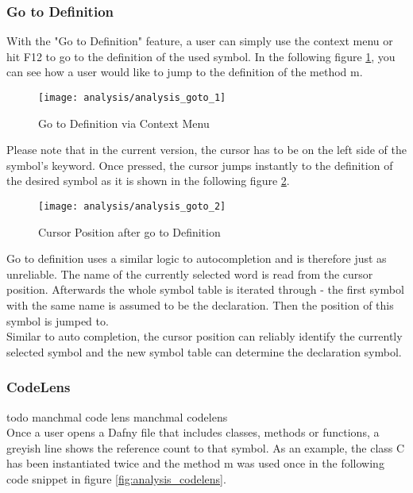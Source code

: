 \subsubsection{Go to Definition}
With the "Go to Definition" feature, a user can simply use the context menu or hit F12 to go to the definition of the used symbol.
In the following figure \ref{fig:analysis_goto_1}, you can see how a user would like to jump to the definition of the method m.

\begin{figure}[H]
    \centering
    \texttt{[image: analysis/analysis\_goto\_1]}
    \caption{Go to Definition via Context Menu}
    \label{fig:analysis_goto_1}
\end{figure}

Please note that in the current version, the cursor has to be on the left side of the symbol's keyword. Once pressed, the cursor jumps instantly to the definition of the desired symbol as it is shown in the following figure \ref{fig:analysis_goto_2}.

\begin{figure}[H]
    \centering
    \texttt{[image: analysis/analysis\_goto\_2]}
    \caption{Cursor Position after go to Definition}
    \label{fig:analysis_goto_2}
\end{figure}

Go to definition uses a similar logic to autocompletion and is therefore just as unreliable.
The name of the currently selected word is read from the cursor position.
Afterwards the whole symbol table is iterated through - the first symbol with the same name is assumed to be the declaration.
Then the position of this symbol is jumped to. \\

Similar to auto completion, the cursor position can reliably identify the currently selected symbol and the new symbol table can determine the declaration symbol.

\subsubsection{CodeLens}
todo manchmal code lens manchmal codelens \\

Once a user opens a Dafny file that includes classes, methods or functions, a greyish line shows the reference count to that symbol. As an example, the class C has been instantiated twice and the method m was used once in the following code snippet in figure \ref{fig:analysis_codelens}.


